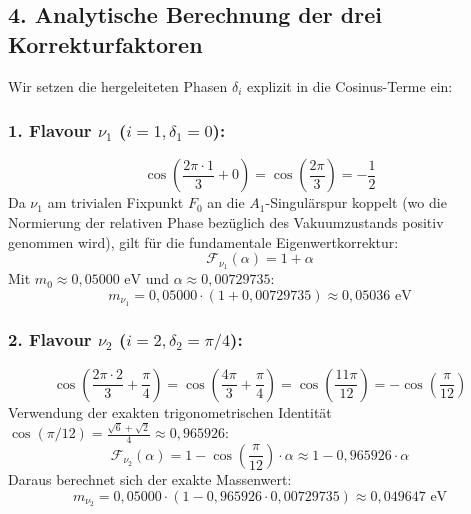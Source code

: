 \documentclass[11pt,a4paper]{article}
\begin{document}
	\subsection{4. Analytische Berechnung der drei Korrekturfaktoren}
	
	Wir setzen die hergeleiteten Phasen $\delta_i$ explizit in die Cosinus-Terme ein:
	
	\subsubsection{1. Flavour \texorpdfstring{$\nu_1$}{nu\_1} (\texorpdfstring{$i=1, \delta_1 = 0$}{i=1, delta\_1=0}):}
	\begin{equation}
		\cos\left(\frac{2\pi \cdot 1}{3} + 0\right) = \cos\left(\frac{2\pi}{3}\right) = -\frac{1}{2}
	\end{equation}
	Da $\nu_1$ am trivialen Fixpunkt $F_0$ an die $A_1$-Singulärspur koppelt (wo die Normierung der relativen Phase bezüglich des Vakuumzustands positiv genommen wird), gilt für die fundamentale Eigenwertkorrektur:
	\begin{equation}
		\mathcal{F}_{\nu_1}(\alpha) = 1 + \alpha
	\end{equation}
	Mit $m_0 \approx 0{,}05000\text{ eV}$ und $\alpha \approx 0{,}00729735$:
	\begin{equation}
		m_{\nu_1} = 0{,}05000 \cdot (1 + 0{,}00729735) \approx 0{,}05036\text{ eV}
	\end{equation}
	
	\subsubsection{2. Flavour \texorpdfstring{$\nu_2$}{nu\_2} (\texorpdfstring{$i=2, \delta_2 = \pi/4$}{i=2, delta\_2=pi/4}):}
	\begin{equation}
		\cos\left(\frac{2\pi \cdot 2}{3} + \frac{\pi}{4}\right) = \cos\left(\frac{4\pi}{3} + \frac{\pi}{4}\right) = \cos\left(\frac{11\pi}{12}\right) = -\cos\left(\frac{\pi}{12}\right)
	\end{equation}
	Verwendung der exakten trigonometrischen Identität $\cos(\pi/12) = \frac{\sqrt{6} + \sqrt{2}}{4} \approx 0{,}965926$:
	\begin{equation}
		\mathcal{F}_{\nu_2}(\alpha) = 1 - \cos\left(\frac{\pi}{12}\right) \cdot \alpha \approx 1 - 0{,}965926 \cdot \alpha
	\end{equation}
	Daraus berechnet sich der exakte Massenwert:
	\begin{equation}
		m_{\nu_2} = 0{,}05000 \cdot (1 - 0{,}965926 \cdot 0{,}00729735) \approx 0{,}049647\text{ eV}
	\end{equation}
	
\end{document}
